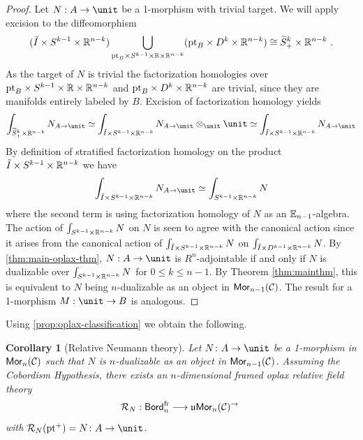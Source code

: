 \documentclass[10pt, reqno, twoside
, final
]{amsart}
\numberwithin{equation}{subsection}%
\theoremstyle{definition}
\theoremstyle{definition}
\theoremstyle{definition}
\theoremstyle{definition}
\theoremstyle{definition}
\theoremstyle{definition}
\theoremstyle{definition}
\theoremstyle{definition}
\theoremstyle{definition}
\theoremstyle{plain}
\theoremstyle{definition}
\theoremstyle{plain}
\theoremstyle{definition}
\theoremstyle{plain}
\newtheorem{cor}[defn]{Corollary}
\theoremstyle{definition}
\theoremstyle{definition}
\theoremstyle{plain}
\theoremstyle{plain}
\theoremstyle{definition}
\theoremstyle{plain}
\theoremstyle{plain}
\theoremstyle{plain}
\begin{document}
\begin{proof}
Let $N:A  \to \unit$ be a 1-morphism with trivial target. We will apply excision to the diffeomorphism
\begin{align*}
    ( \tilde{I} \times S^{k-1}\times \mathbb{R}^{n-k} ) \bigcup_{\text{pt}_B \times S^{k-1}\times \mathbb{R} \times \mathbb{R}^{n-k}} (\text{pt}_{B} \times D^{k} \times \mathbb{R}^{n-k} )  \cong \widetilde{S}^{k}_+  \times \mathbb{R}^{n-k} \ .
\end{align*}
As the target of $N$ is trivial the factorization homologies over $\text{pt}_B \times S^{k-1}\times \mathbb{R} \times \mathbb{R}^{n-k}$ and $\text{pt}_{B} \times D^{k} \times \mathbb{R}^{n-k} $ are trivial, since they are manifolds entirely labeled by $B$. Excision of factorization homology yields
\begin{equation*}
    \int_{\widetilde{S}^{k}_{+} \times \R^{n-k}} N_{A\to \unit} \simeq \int_{\tilde{I} \times S^{k-1}\times \R^{n-k} } N_{A\to \unit} \otimes_{ \unit}   \unit \simeq \int_{\tilde{I} \times S^{k-1}\times \R^{n-k} } N_{A\to \unit} 
\end{equation*}
By definition of stratified factorization homology on the product $\tilde{I} \times S^{k-1}\times \mathbb{R}^{n-k}$ we have
\begin{equation*}
    \int_{\tilde{I} \times S^{k-1}\times \R^{n-k} } N_{A\to \unit} \simeq \int_{S^{k-1}\times \R^{n-k} } N
\end{equation*}
where the second term is using factorization homology of $N$ as an $\mathbb{E}_{n-1}$-algebra. The action of $\int_{S^{k-1}\times \mathbb{R}^{n-k}} N$ on $N$ is seen to agree with the canonical action since it arises from the canonical action of $\int_{\tilde{I} \times S^{k-1}\times \mathbb{R}^{n-k}} N$ on  $\int_{\tilde{I} \times D^{k-1}\times \mathbb{R}^{n-k}} N$. By \cref{thm:main-oplax-thm}, $N:A\to \unit$ is $R^n$-adjointable if and only if $N$ is dualizable over $\int_{S^{k -1} \times \mathbb{R}^{n-k}} N$ for $0\leq k\leq n-1$. By Theorem \ref{thm:mainthm}, this is equivalent to $N$ being $n$-dualizable as an object in $\mathsf{Mor}_{n-1}(\mathcal{C})$. The result for a 1-morphism $M:\unit \to B$ is analogous.
\end{proof}

Using \cref{prop:oplax-classification} we obtain the following.

\begin{cor}[Relative Neumann theory]
Let $N \colon A \to \unit$ be a 1-morphism in $\mathsf{Mor}_n(\mathcal{C})$ such that $N$ is $n$-dualizable as an object in $\mathsf{Mor}_{n-1}(\mathcal{C})$. Assuming the Cobordism Hypothesis, there exists an $n$-dimensional framed oplax relative field theory $$\mathcal{R}_N : \mathsf{Bord}_{n}^{\text{fr}} \longrightarrow  \mathfrak{u}\mathsf{Mor}_{n}(\mathcal{C})^\to \ $$
with $\mathcal{R}_{N}(\pt^+) =  N\colon A \to \unit$.
\end{cor}
\end{document}
